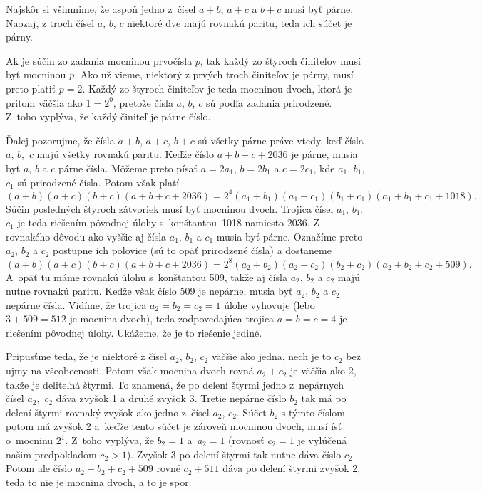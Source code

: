 {%
Najskôr si všimnime, že aspoň jedno z~čísel $a+b$, $a+c$ a $b+c$
musí byť párne. Naozaj, z troch čísel $a$, $b$, $c$
niektoré dve majú rovnakú paritu, teda ich súčet je párny.

Ak je súčin zo zadania mocninou prvočísla $p$,
tak každý zo štyroch činiteľov musí byť mocninou $p$. Ako už vieme,
niektorý z prvých troch činiteľov je párny, musí preto
platiť $p=2$.
Každý zo štyroch činiteľov je teda mocninou dvoch, ktorá je pritom
väčšia ako $1=2^0$, pretože čísla $a$, $b$, $c$ sú podľa zadania
prirodzené. Z~toho vyplýva, že každý činiteľ je párne číslo.

Ďalej pozorujme, že čísla $a+b$, $a+c$, $b+c$ sú všetky párne práve vtedy, keď čísla $a$, $b$,~$c$ majú všetky rovnakú paritu.
Keďže číslo $a+b+c+2036$ je párne, musia byť $a$, $b$ a $c$
párne čísla. Môžeme preto písať $a=2a_1$, $b=2b_1$ a $c=2c_1$,
kde $a_1$, $b_1$, $c_1$ sú prirodzené čísla. Potom však platí
$$
(a+b)(a+c)(b+c)(a+b+c+2036) =
2^4(a_1+b_1)(a_1+c_1)(b_1+c_1)(a_1+b_1+c_1+1018).
$$
Súčin posledných štyroch zátvoriek musí byť mocninou dvoch. Trojica
čísel $a_1$, $b_1$, $c_1$ je teda riešením pôvodnej úlohy
s~konštantou~1018 namiesto 2036. Z rovnakého dôvodu ako vyššie aj čísla $a_1$, $b_1$ a $c_1$ musia byť párne. Označíme
preto $a_2$, $b_2$ a $c_2$ postupne ich polovice (sú to opäť
prirodzené čísla) a dostaneme
$$
(a+b)(a+c)(b+c)(a+b+c+2036) = 2^8(a_2+b_2)(a_2+c_2)(b_2+c_2)(a_2+b_2+c_2+ 509).
$$
A~opäť tu máme rovnakú úlohu s~konštantou 509, takže aj čísla
$a_2$, $b_2$ a $c_2$ majú nutne rovnakú paritu. Keďže však číslo 509
je nepárne, musia byť $a_2$, $b_2$ a $c_2$ nepárne čísla.
Vidíme, že trojica $a_2=b_2=c_2=1$ úlohe vyhovuje (lebo $3+509=512$ je
mocnina dvoch), teda zodpovedajúca trojica $a=b=c=4$ je riešením pôvodnej úlohy.
Ukážeme, že je to riešenie jediné.

Pripusťme teda, že je niektoré z čísel $a_2$, $b_2$, $c_2$
väčšie ako jedna, nech je to $c_2$ bez ujmy na všeobecnosti.
Potom však mocnina dvoch rovná $a_2+c_2$ je väčšia ako 2, takže je
deliteľná štyrmi. To znamená, že po delení štyrmi
jedno z~nepárnych čísel $a_2$,~$c_2$ dáva zvyšok 1 a druhé zvyšok 3.
Tretie nepárne číslo $b_2$ tak má po delení štyrmi rovnaký zvyšok ako
jedno z~čísel $a_2$, $c_2$. Súčet $b_2$ s týmto číslom potom má
zvyšok 2 a~keďže tento súčet je zároveň mocninou dvoch, musí
ísť o~mocninu $2^{1}$. Z~toho vyplýva, že $b_2=1$ a~$a_2=1$
(rovnosť $c_2=1$ je vylúčená našim predpokladom $c_2>1$).
Zvyšok 3 po delení štyrmi tak nutne dáva číslo $c_2$.
Potom ale číslo $a_2+b_2+c_2+509$ rovné $c_2+511$ dáva po
delení štyrmi zvyšok 2, teda to nie je mocnina dvoch, a to je spor.

}
